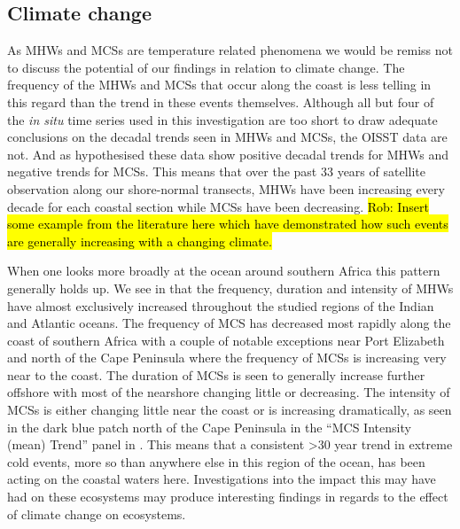 \documentclass[a4paper,10pt,review]{elsarticle}
\begin{document}
\subsection{Climate change}
As MHWs and MCSs are temperature related phenomena we would be remiss not to discuss the potential of our findings in relation to climate change. The frequency of the MHWs and MCSs that occur along the coast is less telling in this regard than the trend in these events themselves. Although all but four of the \emph{in situ} time series used in this investigation are too short to draw adequate conclusions on the decadal trends seen in MHWs and MCSs, the OISST data are not. And as hypothesised these data show positive decadal trends for MHWs and negative trends for MCSs. This means that over the past 33 years of satellite observation along our shore-normal transects, MHWs have been increasing every decade for each coastal section while MCSs have been decreasing. \hl{Rob: Insert some example from the literature here which have demonstrated how such events are generally increasing with a changing climate.}

When one looks more broadly at the ocean around southern Africa this pattern generally holds up. We see in  that the frequency, duration and intensity of MHWs have almost exclusively increased throughout the studied regions of the Indian and Atlantic oceans. The frequency of MCS has decreased most rapidly along the coast of southern Africa with a couple of notable exceptions near Port Elizabeth and north of the Cape Peninsula where the frequency of MCSs is increasing very near to the coast. The duration of MCSs is seen to generally increase further offshore with most of the nearshore changing little or decreasing. The intensity of MCSs is either changing little near the coast or is increasing dramatically, as seen in the dark blue patch north of the Cape Peninsula in the ``MCS Intensity (mean) Trend'' panel in . This means that a consistent >30 year trend in extreme cold events, more so than anywhere else in this region of the ocean, has been acting on the coastal waters here. Investigations into the impact this may have had on these ecosystems may produce interesting findings in regards to the effect of climate change on ecosystems.
\end{document}
